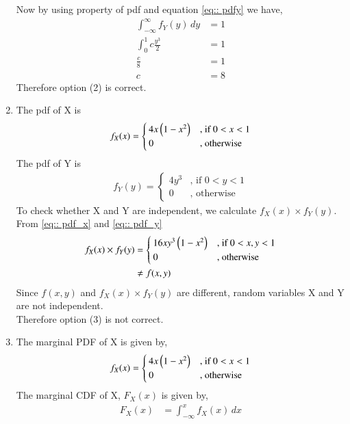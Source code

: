 \documentclass[journal,12pt,twocolumn]{IEEEtran}
\begin{document}
\begin{enumerate}
Now by using property of pdf  and equation \eqref{eq:: pdfy} we have,
\begin{align}
    \int_{-\infty}^{\infty} f_Y(y) \,dy &= 1 \\
    \int_{0}^{1} c\frac{y^3}{2} & =1 \\
    \frac{c}{8} &= 1 \\
    c & = 8
\end{align}
Therefore option (2) is correct. \\
\item
The pdf of X is 
\begin{align}
\label{eq:: pdf_x}
f_X(x)  = 
\begin{cases}
4x \left(1- x^2\right) & \text{, if } 0<x<1
\\
0 & \text{, otherwise }
\end{cases}
\end{align} 
The pdf of Y is 
 \begin{align}
\label{eq:: pdf_y}
f_Y(y)  = 
\begin{cases}
 4y^3 & \text{, if } 0<y<1
\\
0 & \text{, otherwise }
\end{cases}
\end{align}   
To check whether X and Y are independent, we calculate $ f_X(x) \times f_Y(y)  $. From \eqref{eq:: pdf_x} and \eqref{eq:: pdf_y}
\begin{align}
f_X(x) \times f_Y(y) & = 
\begin{cases}
16xy^3 \left(1- x^2\right) & \text{, if } 0<x,y<1 
\\
0 & \text{, otherwise }
\end{cases}
\\
  &\neq f(x,y)
\end{align} 
Since $f(x,y) $ and $ f_X(x) \times f_Y(y) $ are different, random variables X and Y are not independent. \\ 
Therefore option (3) is not correct. \\
\item
The marginal PDF of X is given by,
\begin{align}
\label{eq:: pdf_x1}
f_X(x)  = 
\begin{cases}
4x \left(1- x^2\right) & \text{, if } 0<x<1
\\
0 & \text{, otherwise }
\end{cases}
\end{align} 
The marginal CDF of X, $ F_X(x)$ is given by,
\begin{align}
    F_X(x) &=  \int_{-\infty}^{x} f_X(x) \,dx \\

\end{align}
\end{enumerate}
\end{document}
